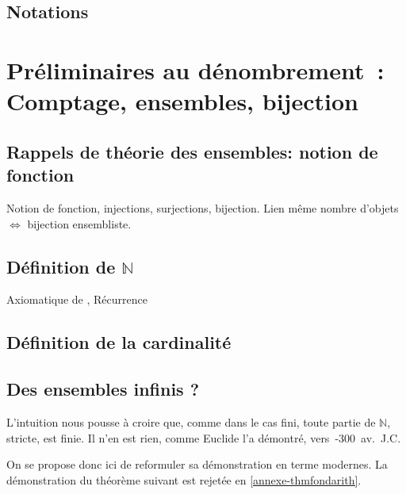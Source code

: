 \documentclass[a4paper,french]{memoir}
\begin{document}
\chapter{Notations}
\mainmatter
\part{Préliminaires au dénombrement~: Comptage, ensembles, bijection}
\chapter{Rappels de théorie des ensembles: notion de fonction}
Notion de fonction, injections, surjections, bijection. 
Lien même nombre d'objets $ \iff$ bijection ensembliste. 
\diagbij
\chapter{\texorpdfstring{Définition de $\mathbb{N}$}{Définition de N}}
Axiomatique de , Récurrence

\chapter{Définition de la cardinalité}
\chapter{Des ensembles infinis ? } 
L'intuition nous pousse à croire que, comme dans le cas fini, toute partie de $\mathbb{N}$, stricte, est finie. Il n'en est rien, comme Euclide l'a démontré, vers~-300~av.~J.C. 

On se propose donc ici de reformuler sa démonstration en terme modernes. 
La démonstration du théorème suivant est rejetée en \cref{annexe-thmfondarith}.
\end{document}
